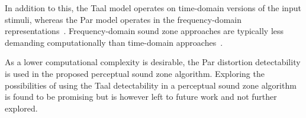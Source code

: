 In addition to this, the Taal model operates on time-domain versions of the input stimuli, 
whereas the Par model operates in the frequency-domain representations~\cite{van2005perceptual, taal2012low}.
Frequency-domain sound zone approaches are typically less demanding computationally than 
time-domain approaches~\cite{vindrola2019personal}.

As a lower computational complexity is desirable, the Par distortion detectability 
is used in the proposed perceptual sound zone algorithm.
Exploring the possibilities of using the Taal detectability in a perceptual sound zone algorithm
is found to be promising but is however left to future work and not further explored.
